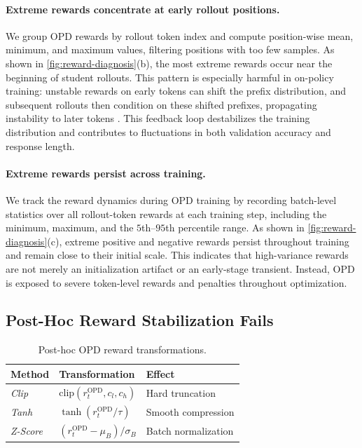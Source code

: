 \paragraph{Extreme rewards concentrate at early rollout positions.}
We group OPD rewards by rollout token index and compute position-wise mean, minimum, and maximum values, filtering positions with too few samples. As shown in \autoref{fig:reward-diagnosis}(b), the most extreme rewards occur near the beginning of student rollouts. This pattern is especially harmful in on-policy training: unstable rewards on early tokens can shift the prefix distribution, and subsequent rollouts then condition on these shifted prefixes, propagating instability to later tokens \citep{ liu2026prefixteachsuffixfade}. This feedback loop destabilizes the training distribution and contributes to fluctuations in both validation accuracy and response length.
\paragraph{Extreme rewards persist across training.}
We track the reward dynamics during OPD training by recording batch-level statistics over all rollout-token rewards at each training step, including the minimum, maximum, and the \(5\)th--\(95\)th percentile range. As shown in \autoref{fig:reward-diagnosis}(c), extreme positive and negative rewards persist throughout training and remain close to their initial scale. This indicates that high-variance rewards are not merely an initialization artifact or an early-stage transient. Instead, OPD is exposed to severe token-level rewards and penalties throughout optimization.

\subsection{Post-Hoc Reward Stabilization Fails}
\label{subsec:standard-fixes}

\begin{table}[t]
  \centering
  \small
  \begin{tabular}{lll}
    \toprule
    \textbf{Method} & \textbf{Transformation} & \textbf{Effect} \\
    \midrule
    \emph{Clip} 
      & $\mathrm{clip}(r_t^{\mathrm{OPD}}, c_l, c_h)$ 
      & Hard truncation \\
    \emph{Tanh} 
      & $\tanh(r_t^{\mathrm{OPD}} / \tau)$ 
      & Smooth compression \\
    \emph{Z-Score} 
      & $(r_t^{\mathrm{OPD}} - \mu_B) / \sigma_B$ 
      & Batch normalization \\
    \bottomrule
  \end{tabular}
  \vspace{-7pt}
    \caption{Post-hoc OPD reward transformations.}
    \vspace{-15pt}
  \label{tab:standard-fixes}
\end{table}

